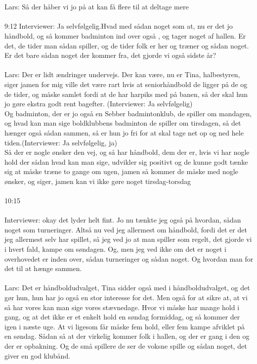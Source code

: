 \\\\
Lars: Så der håber vi jo på at kan få flere til at deltage mere 
\\\\
9:12 Interviewer: Ja selvfølgelig.Hvad med sådan noget som at, nu er det jo håndbold, og så kommer badminton ind over også , og tager noget af hallen. Er det, de tider man sådan spiller, og de tider folk er her og træner og sådan noget. Er det bare sådan noget der kommer fra, det gjorde vi også sidste år? 
\\\\
Lars: Der er lidt ændringer undervejs. Der kan være, nu er Tina, halbestyren, siger jamen for mig ville det være rart hvis at seniorhåndbold de ligger på de og de tider, og måske samlet fordi at de har harpiks med på banen, så der skal hun jo gøre ekstra godt rent bagefter. (Interviewer: Ja selvfølgelig)\\
Og badminton, der er jo også en Sebber badmintonklub, de spiller om mandagen, og hvad kan man sige boldklubbens badminton de spiller om tirsdagen, så det hænger også sådan sammen, så er hun jo fri for at skal tage net op og ned hele tiden.(Interviewer: Ja selvfølgelig, ja)\\
Så der er nogle ønsker den vej, og så har håndbold, dem der er, hvis vi har nogle hold der sådan hvad kan man sige, udvikler sig positivt og de kunne godt tænke sig at måske træne to gange om ugen, jamen så kommer de måske med nogle ønsker,  og siger, jamen kan vi ikke gøre noget tirsdag-torsdag
\\\\
10:15
\\\\
Interviewer: okay det lyder helt fint. Jo nu tænkte jeg også på hvordan, sådan noget som turneringer. Altså nu ved jeg allermest om håndbold, fordi det er det jeg allermest selv har spillet, så jeg ved jo at man spiller som regelt, det gjorde vi i hvert fald, kampe om søndagen. Og, men jeg ved ikke om det er noget i overhovedet er inden over, sådan turneringer og sådan noget. Og hvordan man for det til at hænge sammen. 
\\\\
Lars:  Det er håndboldudvalget, Tina sidder også med i håndboldudvalget, og det gør hun, hun har jo også en stor interesse for det. Men også for at sikre at, at vi så har vores kan man sige vores stævnedage. Hvor vi måske har mange hold i gang, og at det ikke er et enkelt hold en søndag formiddag, og så kommer der igen i næste uge. At vi ligesom får måske fem hold, eller fem kampe afviklet på en søndag. Sådan så at der virkelig kommer folk i hallen, og der er gang i den og der er opbakning. Og de små spillere de ser de voksne spille og sådan noget, det giver en god klubånd.
